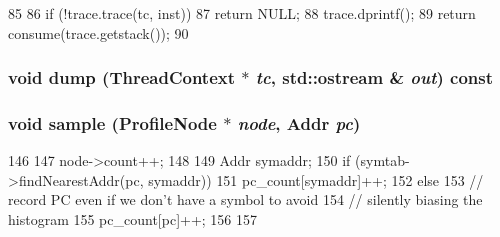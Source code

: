 \begin{DoxyCode}
85 {
86     if (!trace.trace(tc, inst))
87         return NULL;
88     trace.dprintf();
89     return consume(trace.getstack());
90 }
\end{DoxyCode}
\hypertarget{classFunctionProfile_a66ed13eccc3001d33ef51ab3852837e9}{
\subsubsection[{dump}]{\setlength{\rightskip}{0pt plus 5cm}void dump ({\bf ThreadContext} $\ast$ {\em tc}, \/  std::ostream \& {\em out}) const}}
\label{classFunctionProfile_a66ed13eccc3001d33ef51ab3852837e9}
\hypertarget{classFunctionProfile_a89e8cc61802d8d3f9959e2e198196158}{
\subsubsection[{sample}]{\setlength{\rightskip}{0pt plus 5cm}void sample ({\bf ProfileNode} $\ast$ {\em node}, \/  {\bf Addr} {\em pc})}}
\label{classFunctionProfile_a89e8cc61802d8d3f9959e2e198196158}



\begin{DoxyCode}
146 {
147     node->count++;
148 
149     Addr symaddr;
150     if (symtab->findNearestAddr(pc, symaddr)) {
151         pc_count[symaddr]++;
152     } else {
153         // record PC even if we don't have a symbol to avoid
154         // silently biasing the histogram
155         pc_count[pc]++;
156     }
157 }
\end{DoxyCode}


